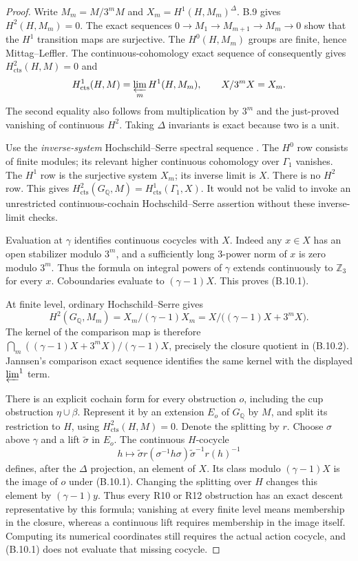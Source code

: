 \begin{proof}
Write $M_m=M/3^mM$ and $X_m=H^1(H,M_m)^\Delta$. B.9 gives
$H^2(H,M_m)=0$. The exact sequences
$0\to M_1\to M_{m+1}\to M_m\to0$ show that the $H^1$ transition
maps are surjective. The $H^0(H,M_m)$ groups are finite, hence
Mittag--Leffler. The continuous-cohomology exact sequence of
\citet[Proposition 1.6 and Theorem 2.2]{BJannsen1988} consequently
gives $H^2_{\mathrm{cts}}(H,M)=0$ and
\[
 H^1_{\mathrm{cts}}(H,M)=\varprojlim_mH^1(H,M_m),\qquad
 X/3^mX=X_m.
\]
The second equality also follows from multiplication by $3^m$ and
the just-proved vanishing of continuous $H^2$. Taking $\Delta$
invariants is exact because two is a unit.

Use the \emph{inverse-system} Hochschild--Serre spectral sequence
\citep[Theorem 3.3]{BJannsen1988}. The $H^0$ row consists of finite
modules; its relevant higher continuous cohomology over $\Gamma_1$
vanishes. The $H^1$ row is the surjective system $X_m$; its inverse
limit is $X$. There is no $H^2$ row. This gives
$H^2_{\mathrm{cts}}(G_{\mathbb Q},M)=H^1_{\mathrm{cts}}(\Gamma_1,X)$.
It would not be valid to invoke an unrestricted continuous-cochain
Hochschild--Serre assertion without these inverse-limit checks.

Evaluation at $\gamma$ identifies continuous cocycles with $X$.
Indeed any $x\in X$ has an open stabilizer modulo $3^m$, and a
sufficiently long $3$-power norm of $x$ is zero modulo $3^m$.
Thus the formula on integral powers of $\gamma$ extends
continuously to $\mathbb Z_3$ for every $x$. Coboundaries evaluate
to $(\gamma-1)X$. This proves (B.10.1).

At finite level, ordinary Hochschild--Serre gives
\[
 H^2(G_{\mathbb Q},M_m)
   =X_m/(\gamma-1)X_m
   =X/\bigl((\gamma-1)X+3^mX\bigr).
\]
The kernel of the comparison map is therefore
$\bigcap_m((\gamma-1)X+3^mX)/(\gamma-1)X$, precisely the closure
quotient in (B.10.2). Jannsen's comparison exact sequence identifies
the same kernel with the displayed $\varprojlim^1$ term.

There is an explicit cochain form for every obstruction $o$, including
the cup obstruction $\eta\cup\beta$. Represent it by an extension
$E_o$ of $G_{\mathbb Q}$ by $M$, and split its restriction to $H$,
using $H^2_{\mathrm{cts}}(H,M)=0$. Denote the splitting by $r$.
Choose $\sigma$ above $\gamma$ and a lift $\widetilde\sigma$ in
$E_o$. The continuous $H$-cocycle
\[
 h\longmapsto
 \widetilde\sigma r(\sigma^{-1}h\sigma)
          \widetilde\sigma^{-1}r(h)^{-1}
\]
defines, after the $\Delta$ projection, an element of $X$.
Its class modulo $(\gamma-1)X$ is the image of $o$ under (B.10.1).
Changing the splitting over $H$ changes this element by
$(\gamma-1)y$. Thus every R10 or R12 obstruction has an exact
descent representative by this formula; vanishing at every finite
level means membership in the closure, whereas a continuous lift
requires membership in the image itself. Computing its numerical
coordinates still requires the actual action cocycle, and (B.10.1)
does not evaluate that missing cocycle.
\end{proof}

